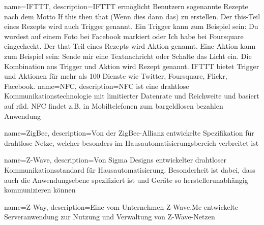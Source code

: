 
{
	name={IFTTT},
	description={IFTTT ermöglicht Benutzern sogenannte \glqq Rezepte\grqq{} nach dem Motto \glqq If this then that\grqq{} (\glqq Wenn dies dann das\grqq) zu erstellen. Der \glqq this\grqq -Teil eines Rezepts wird auch \glqq Trigger\grqq{} genannt. Ein Trigger kann zum Beispiel sein: \glqq Du wurdest auf einem Foto bei Facebook markiert\grqq{} oder \glqq Ich habe bei Foursquare eingecheckt\grqq . Der \glqq that\grqq -Teil eines Rezepts wird Aktion genannt. Eine Aktion kann zum Beispiel sein: \glqq Sende mir eine Textnachricht\grqq{} oder \glqq Schalte das Licht ein\grqq . Die Kombination aus Trigger und Aktion wird Rezept genannt. IFTTT bietet Trigger und Aktionen für mehr als 100 Dienste wie Twitter, Foursquare, Flickr, Facebook.}
}
{
	name={NFC},
	description={NFC ist eine drahtlose Kommunikationstechnologie mit limitierter Datenrate und Reichweite und basiert auf \gls{rfid}. NFC findet z.B. in Mobiltelefonen zum bargeldlosen bezahlen Anwendung}
}




{
	name={ZigBee},
	description={Von der ZigBee-Allianz entwickelte Spezifikation für drahtlose Netze, welcher besonders im Hausautomatisierungsbereich verbreitet ist}
}

{
	name={Z-Wave},
	description={Von Sigma Designs entwickelter drahtloser Kommunikationsstandard für Hausautomatisierung. Besonderheit ist dabei, dass auch die Anwendungsebene spezifiziert ist und Geräte so herstellerunabhängig kommunizieren können}
}

{
	name={Z-Way},
	description={Eine vom Unternehmen Z-Wave.Me entwickelte Serveranwendung zur Nutzung und Verwaltung von Z-Wave-Netzen}
}